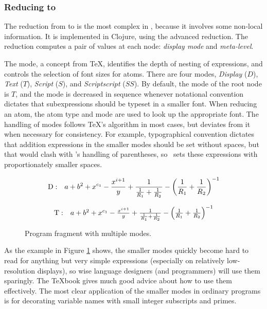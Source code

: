 \subsubsection{Reducing  to }
The reduction from  to  is the most complex in \Meta, because it involves some non-local information. It is implemented in Clojure, using the advanced reduction. The reduction computes a pair of values at each node: \emph{display mode} and \emph{meta-level}.

The mode, a concept from \TeX, identifies the depth of nesting of expressions, and controls the selection of font sizes for atoms. There are four modes, \textit{Display} ($D$), \textit{Text} ($T$), \textit{Script} ($S$), and \textit{Scriptscript} ($SS$). By default, the mode of the root node is $T$, and the mode is decreased in sequence whenever notational convention dictates that subexpressions should be typeset in a smaller font. When reducing an atom, the atom type and mode are used to look up the appropriate font. The handling of modes follows \TeX's algorithm in most cases, but deviates from it when necessary for consistency. For example, typographical convention dictates that addition expressions in the smaller modes should be set without spaces, but that would clash with \Meta's handling of parentheses, so \Meta\ sets these expressions with proportionately smaller spaces.

\begin{figure}[ht]

$$
\mathrm{D:} \quad
a + b^2 + x^{c_1}
 - { x^{i+1} \over y }
 + { 1 \over { 1 \over R_1 }
 + { 1 \over R_2} }
 - \left({ 1 \over R_1 } + { 1 \over R_2}\right)^{-1}
$$

$$
\mathrm{T:} \quad
\textstyle
a + b^2 + x^{c_1}
 - { x^{i+1} \over y }
 + { 1 \over { 1 \over R_1 }
 + { 1 \over R_2} }
 - \left({ 1 \over R_1 } + { 1 \over R_2}\right)^{-1}
$$
\caption{\label{fig-modes} Program fragment with multiple modes.}
\end{figure}

As the example in Figure \ref{fig-modes} shows, the smaller modes quickly become hard to read for anything but very simple expressions (especially on relatively low-resolution displays), so wise language designers (and programmers) will use them sparingly. The \TeX book\cite{knuth} gives much good advice about how to use them effectively. The most clear application of the smaller modes in ordinary programs is for decorating variable names with small integer subscripts and primes.

